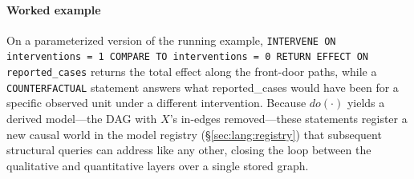 \paragraph{Worked example}
On a parameterized version of the running example, \lstinline[style=causaldsl]|INTERVENE ON interventions = 1 COMPARE TO interventions = 0 RETURN EFFECT ON reported_cases|
returns the total effect along the front-door paths, while a
\lstinline[style=causaldsl]|COUNTERFACTUAL| statement answers what
\textsf{reported\_cases} would have been for a specific observed unit under a
different intervention. Because $do(\cdot)$ yields a derived model---the DAG with
$X$'s in-edges removed---these statements register a new causal world in the
model registry (\S\ref{sec:lang:registry}) that subsequent structural queries can
address like any other, closing the loop between the qualitative and quantitative
layers over a single stored graph.
